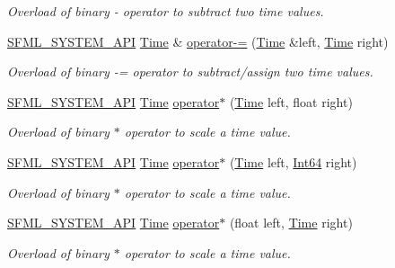 \begin{DoxyCompactItemize}
\begin{DoxyCompactList}\small\item\em Overload of binary -\/ operator to subtract two time values. \end{DoxyCompactList}\item 
\hyperlink{sfml_2dep_2_s_f_m_l-2_84_82_2include_2_s_f_m_l_2_system_2_export_8hpp_a6476c9e422606477a4c23d92b1d79a1f}{S\-F\-M\-L\-\_\-\-S\-Y\-S\-T\-E\-M\-\_\-\-A\-P\-I} \hyperlink{classsf_1_1_time}{Time} \& \hyperlink{classsf_1_1_time_aaf7888302cf4847f97cfc26875367b94}{operator-\/=} (\hyperlink{classsf_1_1_time}{Time} \&left, \hyperlink{classsf_1_1_time}{Time} right)
\begin{DoxyCompactList}\small\item\em Overload of binary -\/= operator to subtract/assign two time values. \end{DoxyCompactList}\item 
\hyperlink{sfml_2dep_2_s_f_m_l-2_84_82_2include_2_s_f_m_l_2_system_2_export_8hpp_a6476c9e422606477a4c23d92b1d79a1f}{S\-F\-M\-L\-\_\-\-S\-Y\-S\-T\-E\-M\-\_\-\-A\-P\-I} \hyperlink{classsf_1_1_time}{Time} \hyperlink{classsf_1_1_time_ac1386c6360872d354b9b59eadcd9778d}{operator$\ast$} (\hyperlink{classsf_1_1_time}{Time} left, float right)
\begin{DoxyCompactList}\small\item\em Overload of binary $\ast$ operator to scale a time value. \end{DoxyCompactList}\item 
\hyperlink{sfml_2dep_2_s_f_m_l-2_84_82_2include_2_s_f_m_l_2_system_2_export_8hpp_a6476c9e422606477a4c23d92b1d79a1f}{S\-F\-M\-L\-\_\-\-S\-Y\-S\-T\-E\-M\-\_\-\-A\-P\-I} \hyperlink{classsf_1_1_time}{Time} \hyperlink{classsf_1_1_time_acd021b3ebb108053d7dec56869e27385}{operator$\ast$} (\hyperlink{classsf_1_1_time}{Time} left, \hyperlink{namespacesf_a2840579fed3494d9f330baf7a5a19903}{Int64} right)
\begin{DoxyCompactList}\small\item\em Overload of binary $\ast$ operator to scale a time value. \end{DoxyCompactList}\item 
\hyperlink{sfml_2dep_2_s_f_m_l-2_84_82_2include_2_s_f_m_l_2_system_2_export_8hpp_a6476c9e422606477a4c23d92b1d79a1f}{S\-F\-M\-L\-\_\-\-S\-Y\-S\-T\-E\-M\-\_\-\-A\-P\-I} \hyperlink{classsf_1_1_time}{Time} \hyperlink{classsf_1_1_time_a63723c9e9c5ff6151377ec4350c6f36e}{operator$\ast$} (float left, \hyperlink{classsf_1_1_time}{Time} right)
\begin{DoxyCompactList}\small\item\em Overload of binary $\ast$ operator to scale a time value. \end{DoxyCompactList}\item 

\end{DoxyCompactItemize}
